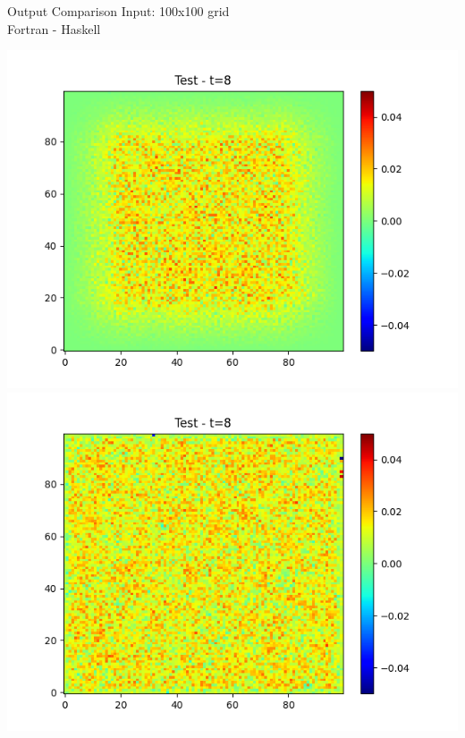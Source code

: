 \documentclass{beamer}
\begin{document}
\begin{frame}{Output Comparison}
    Input: 100x100 grid\\
    Fortran - Haskell
    \begin{center}
        \includegraphics[scale=0.32]{figure/frame_8.png}
        \includegraphics[scale=0.32]{figure/frame_2_8.png}
    \end{center}
\end{frame}
\end{document}
